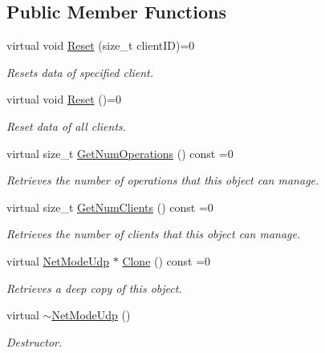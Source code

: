 \subsection*{Public Member Functions}
\begin{DoxyCompactItemize}
\item 
virtual void \hyperlink{class_net_mode_udp_af5895c1120cdc8d0d04bd3e1bb34bdd7}{Reset} (size\_\-t clientID)=0
\begin{DoxyCompactList}\small\item\em Resets data of specified client. \item\end{DoxyCompactList}\item 
\hypertarget{class_net_mode_udp_a98f0f341f78e761db934c839606a39df}{
virtual void \hyperlink{class_net_mode_udp_a98f0f341f78e761db934c839606a39df}{Reset} ()=0}
\label{class_net_mode_udp_a98f0f341f78e761db934c839606a39df}

\begin{DoxyCompactList}\small\item\em Reset data of all clients. \item\end{DoxyCompactList}\item 
virtual size\_\-t \hyperlink{class_net_mode_udp_a36a62c7bf9df7c7d7f2a3ad5cfb79b42}{GetNumOperations} () const =0
\begin{DoxyCompactList}\small\item\em Retrieves the number of operations that this object can manage. \item\end{DoxyCompactList}\item 
virtual size\_\-t \hyperlink{class_net_mode_udp_a2ec3aa4ddf8d531d1754f8be2a1d87ba}{GetNumClients} () const =0
\begin{DoxyCompactList}\small\item\em Retrieves the number of clients that this object can manage. \item\end{DoxyCompactList}\item 
virtual \hyperlink{class_net_mode_udp}{NetModeUdp} $\ast$ \hyperlink{class_net_mode_udp_ae0160135a69173309701952b9bdf7488}{Clone} () const =0
\begin{DoxyCompactList}\small\item\em Retrieves a deep copy of this object. \item\end{DoxyCompactList}\item 
\hypertarget{class_net_mode_udp_ac23ff26a8db43639290822e40101a93e}{
virtual \hyperlink{class_net_mode_udp_ac23ff26a8db43639290822e40101a93e}{$\sim$NetModeUdp} ()}
\label{class_net_mode_udp_ac23ff26a8db43639290822e40101a93e}

\begin{DoxyCompactList}\small\item\em Destructor. \item\end{DoxyCompactList}\end{DoxyCompactItemize}

